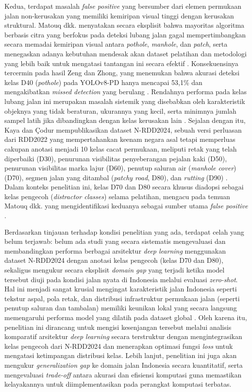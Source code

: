 Kedua, terdapat masalah \textit{false positive} yang bersumber dari elemen
permukaan jalan non-kerusakan yang memiliki kemiripan visual tinggi dengan
kerusakan struktural. Matouq dkk. menyatakan secara eksplisit
bahwa mayoritas algoritma berbasis citra yang berfokus pada deteksi lubang
jalan gagal mempertimbangkan secara memadai kemiripan visual
antara \textit{pothole}, \textit{manhole}, dan \textit{patch}, serta
menegaskan adanya kebutuhan mendesak akan dataset pelatihan dan metodologi
yang lebih baik untuk mengatasi tantangan ini secara efektif
\cite{matouq2024ai, Shi_2026}. Konsekuensinya tercermin pada hasil Zeng
dan Zhong, yang menemukan bahwa akurasi deteksi kelas D40
(\textit{pothole}) pada YOLOv8-PD hanya mencapai 53,1\% dan mengakibatkan
\textit{missed detection} yang berulang \cite{Zeng2024}. Rendahnya performa
pada kelas lubang jalan ini merupakan masalah sistemik yang disebabkan oleh
karakteristik objeknya yang tidak beraturan, ukurannya yang kecil, serta
minimnya jumlah sampel latih jika dibandingkan dengan kelas kerusakan lain
\cite{Zeng2024}. Sejalan dengan itu, Kaya dan \c{C}odur mempublikasikan
dataset N-RDD2024, sebuah versi perluasan dari RDD2022 yang mempertahankan
keenam negara asal tetapi memperluas cakupan anotasi menjadi 10 kelas cacat
permukaan, meliputi retak yang telah diperbaiki (D30), penurunan visibilitas
penyeberangan pejalan kaki (D50), penurunan visibilitas marka lajur (D60),
penutup saluran air (\textit{manhole cover}) (D70), segmen jalan yang ditambal (\textit{patchy
  road}, D80), dan \textit{rutting} (D90) \cite{kaya2024nrdd2024}. Dalam
konteks penelitian ini, kelas D70 dan D80 secara khusus diadopsi sebagai
kelas pengecoh (\textit{distractor classes}) selama pelatihan, mengacu pada
temuan Matouq dkk. yang mengidentifikasi keduanya sebagai sumber
utama \textit{false positive} \cite{matouq2024ai}.

Berdasarkan tinjauan terhadap kondisi penelitian yang ada, terdapat celah yang belum terjawab: belum ada studi yang secara sistematis mengevaluasi dan membandingkan performa berbagai arsitektur \textit{deep learning} menggunakan dataset N-RDD2024 dengan anotasi kelas pengecoh (kelas D70 dan D80), sekaligus mengukur secara eksplisit \textit{domain gap} yang terjadi ketika model tersebut diuji pada kondisi jalan nyata di Indonesia melalui evaluasi \textit{zero-shot}. Hal ini menjadi sangat krusial mengingat karakteristik jalan Indonesia seperti tekstur aspal, pola retak, dan distribusi infrastruktur permukaan jalan (seperti penutup saluran dan tambalan) memiliki keunikan lokal yang secara langsung memengaruhi performa model yang dilatih pada dataset global  \cite{Arya2024846, hugo2025efficientdet}. Oleh karena itu, penelitian ini dirancang untuk mengisi kesenjangan tersebut melalui analisis komparatif arsitektur \textit{deep learning} secara terstruktur dengan mengintegrasikan kelas pengecoh dari N-RDD2024 dan menerapkan optimasi fungsi \textit{loss} untuk mengatasi ketimpangan distribusi kelas. Lebih lanjut, penelitian ini juga akan mengukur \textit{generalization gap} ke domain jalan Indonesia secara kuantitatif, serta mengevaluasi \textit{trade-off} antara akurasi dan efisiensi komputasi guna memastikan kelayakannya untuk diimplementasikan pada perangkat komputasi terbatas.

